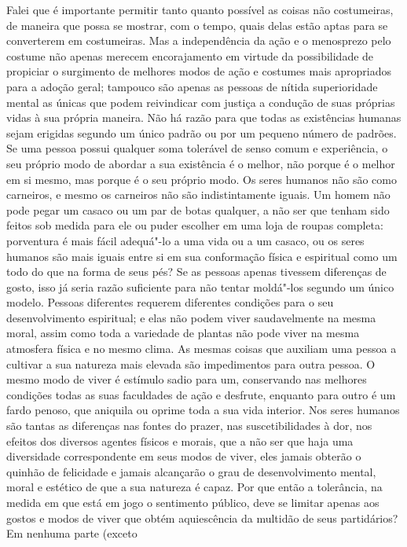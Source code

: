 Falei que é importante permitir tanto quanto possível as coisas
não costumeiras, de maneira que possa se mostrar, com o tempo, quais
delas estão aptas para se converterem em costumeiras. Mas a
independência da ação e o menosprezo pelo costume não apenas merecem
encorajamento em virtude da possibilidade de propiciar o surgimento de
melhores modos de ação e costumes mais apropriados para a adoção geral;
tampouco são apenas as pessoas de nítida superioridade mental as únicas
que podem reivindicar com justiça a condução de suas próprias vidas à
sua própria maneira. Não há razão para que todas as existências humanas
sejam erigidas segundo um único padrão ou por um pequeno número de
padrões. Se uma pessoa possui qualquer soma tolerável de senso comum e
experiência, o seu próprio modo de abordar a sua existência é o melhor,
não porque é o melhor em si mesmo, mas porque é o seu próprio modo. Os
seres humanos não são como carneiros, e mesmo os carneiros não são
indistintamente iguais. Um homem não pode pegar um casaco ou um par de
botas qualquer, a não ser que tenham sido feitos sob medida para ele ou
puder escolher em uma loja de roupas completa: porventura é mais fácil
adequá"-lo a uma vida ou a um casaco, ou os seres humanos são mais
iguais entre si em sua conformação física e espiritual como um todo do
que na forma de seus pés? Se as pessoas apenas tivessem diferenças de
gosto, isso já seria razão suficiente para não tentar moldá"-los segundo
um único modelo. Pessoas diferentes requerem diferentes condições para
o seu desenvolvimento espiritual; e elas não podem viver saudavelmente
na mesma moral, assim como toda a variedade de plantas não pode viver
na mesma atmosfera física e no mesmo clima. As mesmas coisas que
auxiliam uma pessoa a cultivar a sua natureza mais elevada são
impedimentos para outra pessoa. O mesmo modo de viver é estímulo sadio
para um, conservando nas melhores condições todas as suas faculdades de
ação e desfrute, enquanto para outro é um fardo penoso, que aniquila ou
oprime toda a sua vida interior. Nos seres humanos são tantas as
diferenças nas fontes do prazer, nas suscetibilidades à dor, nos
efeitos dos diversos agentes físicos e morais, que a não ser que haja
uma diversidade correspondente em seus modos de viver, eles jamais
obterão o quinhão de felicidade e jamais alcançarão o grau de
desenvolvimento mental, moral e estético de que a sua natureza é capaz.
Por que então a tolerância, na medida em que está em jogo o sentimento
público, deve se limitar apenas aos gostos e modos de viver que obtém
aquiescência da multidão de seus partidários? Em nenhuma parte (exceto

